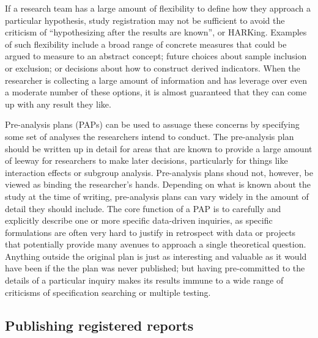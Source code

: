 If a research team has a large amount of flexibility
to define how they approach a particular hypothesis,
study registration may not be sufficient to avoid the criticism of
``hypothesizing after the results are known'', or HARKing.\cite{kerr1998harking}
Examples of such flexibility include a broad range 
of concrete measures that could be argued to measure to an abstract concept;
future choices about sample inclusion or exclusion;
or decisions about how to construct derived indicators.
When the researcher is collecting a large amount of information
and has leverage over even a moderate number of these options,
it is almost guaranteed that they can come up with any result they like.\cite{gelman2013garden}

Pre-analysis plans (PAPs) can be used to assuage these concerns
by specifying some set of analyses the researchers intend to conduct.
The pre-analysis plan should be written up in detail
for areas that are known to provide a large amount of leeway
for researchers to make later decisions,
particularly for things like interaction effects or subgroup analysis.
Pre-analysis plans shoud not, however, be viewed as binding the researcher's hands.\cite{olken2015promises}
Depending on what is known about the study at the time of writing,
pre-analysis plans can vary widely in the amount of detail they should include.
The core function of a PAP is to carefully and explicitly describe
one or more specific data-driven inquiries,
as specific formulations are often very hard to justify in retrospect
with data or projects that potentially provide many avenues to approach
a single theoretical question.
Anything outside the original plan is just as interesting and valuable
as it would have been if the the plan was never published;
but having pre-committed to the details of a particular inquiry makes its results
immune to a wide range of criticisms of specification searching or multiple testing.\cite{duflo2020praise}


\subsection{Publishing registered reports}

